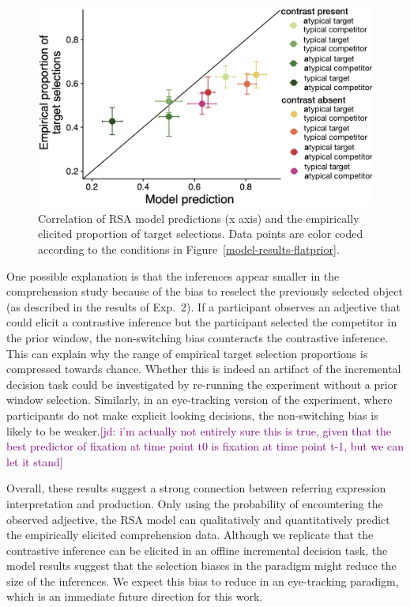 \documentclass[10pt,letterpaper]{article}
\newcommand{\ek}[1]{\textcolor{Orange}{[ek: #1]}}
\newcommand{\jd}[1]{\textcolor{Purple}{[jd: #1]}}
\begin{document}
\begin{figure}
	\begin{center}
		\includegraphics[width=.475\textwidth]{graphs/corr-plot.pdf}
	\end{center}
\caption{Correlation of RSA model predictions (x axis) and the empirically elicited proportion of target selections. Data points are color coded according to the conditions in Figure~\ref{model-results-flatprior}.} 
\label{model-results-corr-flatprior}
\end{figure}

One possible explanation is that the inferences appear smaller in the comprehension study because of the bias to reselect the previously selected object (as described in the results of Exp.~2). If a participant observes an adjective that could elicit a contrastive inference but the participant selected the competitor in the prior window, the non-switching bias counteracts the contrastive inference. This can explain why the range of empirical target selection proportions is compressed towards chance. Whether this is indeed an artifact of the incremental decision task could be investigated by re-running the experiment without a prior window selection. Similarly, in an eye-tracking version of the experiment, where participants do not make explicit looking decisions, the non-switching bias is likely to be weaker.\jd{i'm actually not entirely sure this is true, given that the best predictor of fixation at time point t0 is fixation at time point t-1, but we can let it stand}


Overall, these results suggest a strong connection between referring expression interpretation and production. Only using the probability of encountering the observed adjective, the RSA model can qualitatively and quantitatively predict the empirically elicited comprehension data. Although we replicate that the contrastive inference can be elicited in an offline incremental decision task, the model results suggest that the selection biases in the paradigm might reduce the size of the inferences. We expect this bias to reduce in an eye-tracking paradigm, which is an immediate future direction for this work.
\end{document}

